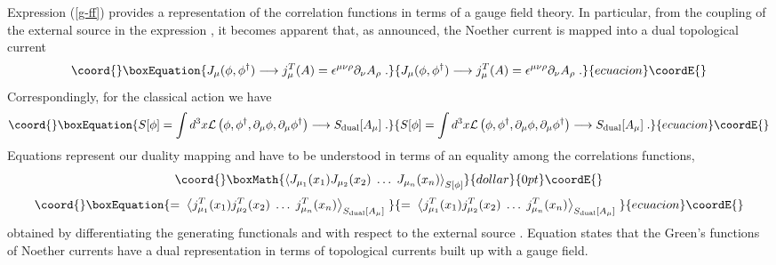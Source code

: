 \documentclass[a4paper,12pt]{article}
\begin{document}
Expression (\ref{g-ff}) provides a representation of the
correlation functions in terms of a \coordHE{} gauge field theory. In particular, from the coupling of the
external source \coordHE{} in the expression \myHighlight{$\left( {\rm
    {\ref{g-ff}}}\right) $}\coordHE{}, it becomes apparent that, as announced,
the\coordHE{} Noether current \coordHE{} is mapped into a dual topological
current
\begin{equation}\coord{}\boxEquation{
\label{dual1}
J_\mu (\phi ,\phi ^{\dagger })\longrightarrow j_\mu^T (A)=\epsilon^{\mu \nu \rho }\partial _\nu A_\rho \;.
}{
J_\mu (\phi ,\phi ^{\dagger })\longrightarrow j_\mu^T (A)=\epsilon^{\mu \nu \rho }\partial _\nu A_\rho \;.
}{ecuacion}\coordE{}\end{equation}
Correspondingly, for the classical action we have
\begin{equation}\coord{}\boxEquation{
\label{dual2}
S[\phi]=\int d^3x {\cal L}\left( \phi ,\phi ^{\dagger },\partial _\mu  \phi
,\partial _\mu \phi ^{\dagger }\right)\longrightarrow S_{{\rm dual}}[A_\mu]\;.
}{
S[\phi]=\int d^3x {\cal L}\left( \phi ,\phi ^{\dagger },\partial _\mu  \phi
,\partial _\mu \phi ^{\dagger }\right)\longrightarrow S_{{\rm dual}}[A_\mu]\;.
}{ecuacion}\coordE{}\end{equation}
Equations \myHighlight{$\left( {\rm {\ref{dual1}}}\right) ,\;\left( {\rm {\ref{dual2}}}%
\right) \;$}\coordHE{}represent our duality mapping and have to be understood in
terms of an equality among the correlations functions,
$$\coord{}\boxMath{
\left\langle J_{\mu _1}(x_1)J_{\mu
    _2}(x_2)\;\ldots\;J_{\mu _n}(x_n)\right\rangle _{S[\phi]}
}{dollar}{0pt}\coordE{}$$
\begin{equation}\coord{}\boxEquation{
 \label{corr}
=\;\left\langle j_{\mu _1}^T(x_1)j_{\mu _2}^T(x_2)\;\ldots\;
j_{\mu_n}^T(x_n)\right\rangle _{S_{{\rm dual}}[A_\mu]}\;
}{
 =\;\left\langle j_{\mu _1}^T(x_1)j_{\mu _2}^T(x_2)\;\ldots\;
j_{\mu_n}^T(x_n)\right\rangle _{S_{{\rm dual}}[A_\mu]}\;
}{ecuacion}\coordE{}\end{equation}
obtained by differentiating the generating functionals \myHighlight{$\left( {\rm
    {\ref {g-f}}}\right) $}\coordHE{} and \myHighlight{$\left( {\rm {\ref{g-ff}}}\right) $}\coordHE{}
with respect to the external source \coordHE{}. Equation \myHighlight{$\left( {\rm
    {\ref{corr}}}\right) $}\coordHE{} states that the Green's functions of \coordHE{}
Noether currents have a dual representation in terms of topological
currents built up with a gauge field.
\end{document}
